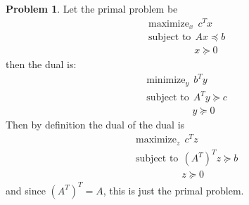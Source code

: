 \documentclass[letterpaper,12pt]{article}
\theoremstyle{definition}
\newtheorem{problem}[theorem]{Problem}
\begin{document}
\begin{problem}{8.17}
Let the primal problem be   
\begin{align*}
&\text{maximize}_x \ \ c^Tx \\
  &\text{subject to} \ \ Ax \preceq b \\
  &\qquad \qquad \ \ \ x \succeq 0
\end{align*}
then the dual is:
\begin{align*}
&\text{minimize}_y \ \ b^Ty \\
  &\text{subject to} \ \ A^Ty \succeq c \\
  &\qquad \qquad \ \ \ y \succeq 0
\end{align*}
Then by definition the dual of the dual is
\begin{align*}
&\text{maximize}_z \ \ c^Tz \\
  &\text{subject to} \ \ (A^T)^Tz \succeq b \\
  &\qquad \qquad \ \ \ z \succeq 0
\end{align*}
and since $(A^T)^T = A$, this is just the primal problem.
\end{problem}
\end{document}
